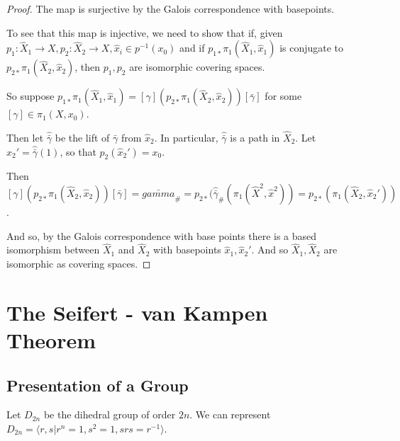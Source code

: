 \documentclass[10pt,a4paper]{article}
\begin{document}
\begin{proof}
The map is surjective by the Galois correspondence with basepoints.

To see that this map is injective, we need to show that if, given $p_1:\hat{X}_1 \to X, p_2:\hat{X}_2 \to X, \hat{x}_i \in p^{-1}(x_0)$ and if $p_{1\ast} \pi_1(\hat{X}_1, \hat{x}_1)$ is conjugate to $p_{2\ast} \pi_1(\hat{X}_2, \hat{x}_2)$, then $p_1, p_2$ are isomorphic covering spaces.

So suppose $p_{1\ast}\pi_1(\hat{X}_1, \hat{x}_1) = [\gamma](p_{2\ast}\pi_1(\hat{X}_2, \hat{x}_2))[\bar{\gamma}]$ for some $[\gamma]\in \pi_1(X, x_0)$.

Then let $\hat{\bar{\gamma}}$ be the lift of $\bar{\gamma}$ from $\hat{x}_2$. In particular, $\hat{\bar{\gamma}}$ is a path in $\hat{X}_2$. Let $\hat{x}_2' = \hat{\bar{\gamma}}(1)$, so that $p_2(\hat{x}_2') = x_0$.

Then $[\gamma](p_{2\ast}\pi_1(\hat{X}_2, \hat{x}_2))[\bar{\gamma}] = \bar{gamma}_{\#} = p_{2\ast}(\hat{\bar{\gamma}}_{\#}(\pi_1(\hat{X}^2, \hat{x}^2)) = p_{2\ast}(\pi_1(\hat{X}_2, \hat{x}_2'))$.

And so, by the Galois correspondence with base points there is a based isomorphism between $\hat{X}_1$ and $\hat{X}_2$ with basepoints $\hat{x}_1, \hat{x}_2'$. And so $\hat{X}_1, \hat{X}_2$ are isomorphic as covering spaces.
\end{proof}

\section{The Seifert - van Kampen Theorem}
\subsection*{Presentation of a Group}
Let $D_{2n}$ be the dihedral group of order $2n$. We can represent $D_{2n} = \langle r,s | r^n = 1, s^2 = 1, srs = r^{-1}\rangle$.
\end{document}
